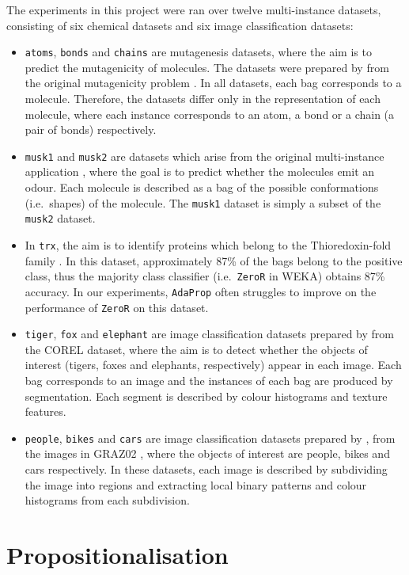 \documentclass[a4paper,12pt]{report} %
\newcommand{\AdaProp}{\texttt{AdaProp}\xspace}
\newcommand{\tdsMA}{\texttt{atoms}\xspace}
\newcommand{\tdsMB}{\texttt{bonds}\xspace}
\newcommand{\tdsMC}{\texttt{chains}\xspace}
\newcommand{\tdsMU}{\texttt{musk1}\xspace}
\newcommand{\tdsMK}{\texttt{musk2}\xspace}
\newcommand{\tdsTX}{\texttt{trx}\xspace}
\newcommand{\tdsTG}{\texttt{tiger}\xspace}
\newcommand{\tdsFX}{\texttt{fox}\xspace}
\newcommand{\tdsEL}{\texttt{elephant}\xspace}
\newcommand{\tdsPP}{\texttt{people}\xspace}
\newcommand{\tdsBK}{\texttt{bikes}\xspace}
\newcommand{\tdsCA}{\texttt{cars}\xspace}
\begin{document}
The experiments in this project were ran over twelve multi-instance datasets, 
	consisting of six chemical datasets and six image classification datasets:
	\begin{itemize}
	\item \tdsMA, \tdsMB and \tdsMC are mutagenesis datasets,
		where the aim is to predict the mutagenicity of molecules.
		The datasets were prepared by  
		from the original mutagenicity problem \cite{mutagenesis}.
		In all datasets, each bag corresponds to a molecule.
		Therefore, the datasets differ only in the representation of each molecule,
			where each instance corresponds to an atom, a bond or a chain (a pair of bonds) respectively.
	\item \tdsMU and \tdsMK are datasets which arise from the original multi-instance application \cite{Diet97},
		where the goal is to predict whether the molecules emit an odour.
		Each molecule is described as a bag of the possible conformations (i.e.\ shapes) of the molecule.
		The \tdsMU dataset is simply a subset of the \tdsMK dataset.
	\item In \tdsTX, the aim is to identify proteins which belong to the Thioredoxin-fold family \cite{trxpaper}.
		In this dataset, approximately 87\% of the bags belong to the positive class,
		thus the majority class classifier (i.e.\ \texttt{ZeroR} in WEKA) obtains 87\% accuracy.
		In our experiments, \AdaProp often struggles to improve on the performance of \texttt{ZeroR} on this dataset.
	\item \tdsTG, \tdsFX and \tdsEL are image classification datasets prepared by  from the COREL
		dataset, where the aim is to detect whether the objects of interest 
		(tigers, foxes and elephants, respectively) appear in each image.
		Each bag corresponds to an image and the instances of each bag are produced by segmentation.
		Each segment is described by colour histograms and texture features.
	\item \tdsPP, \tdsBK and \tdsCA are image classification datasets prepared by , 
		from the images in GRAZ02 \cite{graz02},
		where the objects of interest are people, bikes and cars respectively.
		In these datasets, each image is described by subdividing the image into regions
			and extracting local binary patterns and colour histograms from each subdivision.
		
	\end{itemize}

\section{Propositionalisation}
\label{resProp}
\end{document}
